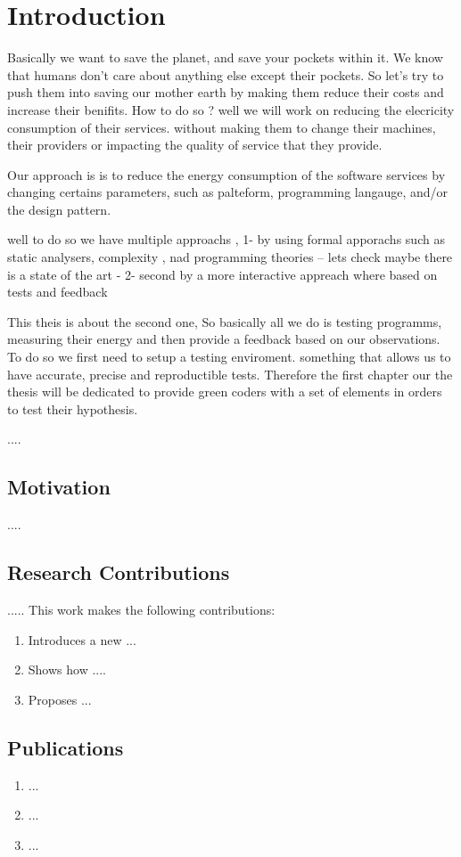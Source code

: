 \newpage
\chapter{Introduction}
\label{chapter:introduction}

Basically we want to save the planet, and save your pockets within it.
We know that humans don't care about anything else except their pockets. So let's try to push them into saving our mother earth by making them reduce their costs and increase their benifits.
How to do so ?
well we will work on reducing the elecricity consumption of their services. without making them to change their machines, their providers or impacting the quality of service that they provide.

Our approach is is to reduce the energy consumption of the software services by changing certains parameters, such as palteform, programming langauge, and/or the design pattern.

well to do so we have multiple approachs ,
1- by using formal apporachs such as static analysers, complexity , nad programming theories -- lets check maybe there is a state of the art -
2- second by a more interactive appreach where based on tests and feedback

This theis is about the second one, So basically all we do is testing programms, measuring their energy and then provide a feedback based on our observations.
To do so we first need to setup a testing enviroment. something that allows us to have accurate, precise and reproductible tests.
Therefore the first chapter our the thesis will be dedicated to provide green coders with a set of elements in orders to test their hypothesis.



....


\section{Motivation}
....


\section{Research Contributions}
..... This work makes the following contributions:

\begin{enumerate}

    \item Introduces a new ...
    \item Shows how ....
    \item Proposes ...

\end{enumerate}



\section{Publications}

\begin{enumerate}
    \item ...

    \item ...

    \item ...

\end{enumerate}
\cleardoublepage
